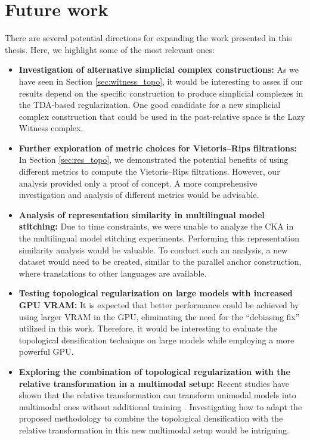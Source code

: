 \documentclass[../main.tex]{subfiles}
\begin{document}
\section{Future work}
\label{sec:futureWork}
There are several potential directions for expanding the work presented in this thesis. Here, we highlight some of the most relevant ones:
\begin{itemize}
    \item \textbf{Investigation of alternative simplicial complex constructions:} As we have seen in Section \ref{sec:witness_topo}, it would be interesting to asses if our results depend on the specific construction to produce simplicial complexes in the TDA-based regularization. One good candidate for a new simplicial complex construction that could be used in the post-relative space is the Lazy Witness complex.

    \item \textbf{Further exploration of metric choices for Vietoris–Rips filtrations:} In Section \ref{sec:res_topo}, we demonstrated the potential benefits of using different metrics to compute the Vietoris–Rips filtrations. However, our analysis provided only a proof of concept. A more comprehensive investigation and analysis of different metrics would be advisable.

    \item \textbf{Analysis of representation similarity in multilingual model stitching:} Due to time constraints, we were unable to analyze the CKA in the multilingual model stitching experiments. Performing this representation similarity analysis would be valuable. To conduct such an analysis, a new dataset would need to be created, similar to the parallel anchor construction, where translations to other languages are available.

    \item \textbf{Testing topological regularization on large models with increased GPU VRAM:} It is expected that better performance could be achieved by using larger VRAM in the GPU, eliminating the need for the ``debiasing fix'' utilized in this work. Therefore, it would be interesting to evaluate the topological densification technique on large models while employing a more powerful GPU.

    \item \textbf{Exploring the combination of topological regularization with the relative transformation in a multimodal setup:} Recent studies have shown that the relative transformation can transform unimodal models into multimodal ones without additional training \cite{norelli_asif_2022}. Investigating how to adapt the proposed methodology to combine the topological densification with the relative transformation in this new multimodal setup would be intriguing.
\end{itemize}
\end{document}
